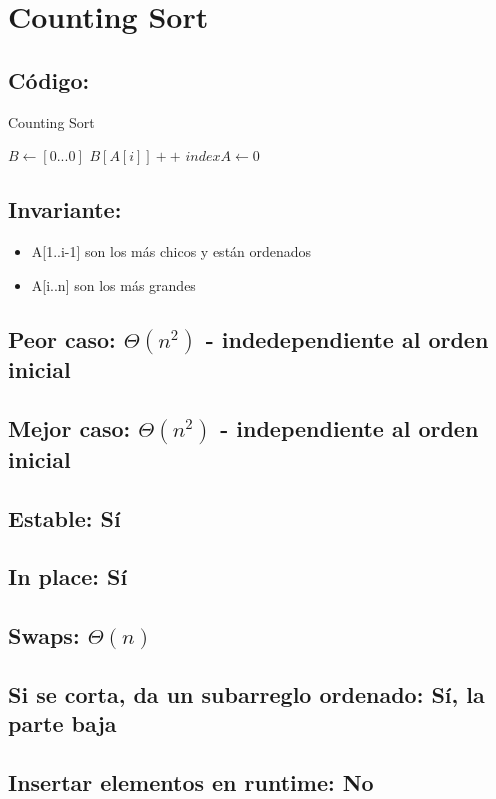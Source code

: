 \documentclass[a4paper]{article}
\begin{document}
\newpage
\section{Counting Sort}

\subsection{C\'odigo:}
\begin{algorithm}
\caption{Counting Sort}\label{selection}
\begin{algorithmic}[1]
	\State $B \gets [0...0]$ 
	 
		\State $B[A[i]]++$
	\EndFor
	\State $indexA \gets 0$
	\For
\EndProcedure
\end{algorithmic}
\end{algorithm}

\subsection{Invariante:}
\begin{itemize}
	\item{A[1..i-1] son los m\'as chicos y est\'an ordenados}
	\item{A[i..n] son los m\'as grandes}
\end{itemize}

\subsection{Peor caso: $\Theta (n^{2})$ - indedependiente al orden inicial}
\subsection{Mejor caso: $\Theta (n^{2})$ - independiente al orden inicial}
\subsection{Estable: S\'i}
\subsection{In place: S\'i}
\subsection{Swaps: $\Theta (n)$}
\subsection{Si se corta, da un subarreglo ordenado: S\'i, la parte baja}
\subsection{Insertar elementos en runtime: No}
\end{document}
